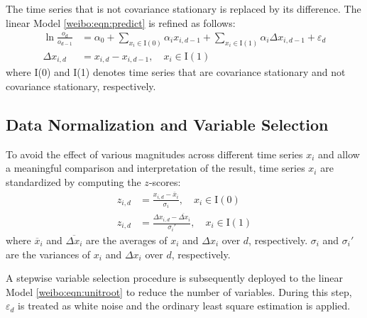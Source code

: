 \documentclass[review,3p,times,12pt,number]{elsarticle}
\begin{document}
The time series that is not covariance stationary is replaced by its difference. The linear Model \ref{weibo:eqn:predict} is refined as follows:
\begin{equation}
\label{weibo:eqn:unitroot}
\begin{split}
	\ln \frac{o_d}{o_{d-1}} & =   \alpha_0 + \sum_{x_i \in \mathrm I(0)} \alpha_i x_{i,d-1}  + \sum_{x_i \in \mathrm I(1)} \alpha_i \Delta x_{i,d-1}+  \varepsilon_d \\
	\Delta x_{i,d}          & =   x_{i, d} - x_{i, d-1},\quad x_i\in \mathrm I(1)
\end{split}
\end{equation}
where I(0) and I(1) denotes time series that are covariance stationary and not covariance stationary, respectively.

\subsection{Data Normalization and Variable Selection}

To avoid the effect of various magnitudes across different time series $x_i$ and allow a meaningful comparison and interpretation of the result, time series $x_i$ are standardized by computing the $z$-scores:
\begin{equation}
\begin{split}
    z_{i,d}  &  = \frac{x_{i,d} - \overline{x}_i}{\sigma_i}, \quad x_i\in \mathrm I(0)\\
    z_{i,d}  &  = \frac{\Delta x_{i,d}-\overline{\Delta x}_i}{\sigma_i'}, \quad x_i\in \mathrm I(1)
\end{split}
\end{equation}
where $\overline{x}_i$ and $\overline{\Delta x_i}$ are the averages of $x_i$ and $\Delta x_i$ over $d$, respectively. $\sigma_i$ and $\sigma_i'$ are the variances of $x_i$ and $\Delta x_i$ over $d$, respectively.

A stepwise variable selection procedure is subsequently deployed to the linear Model \ref{weibo:eqn:unitroot} to reduce the number of variables. During this step, $\varepsilon_d$ is treated as white noise and the ordinary least square estimation is applied.
\end{document}
